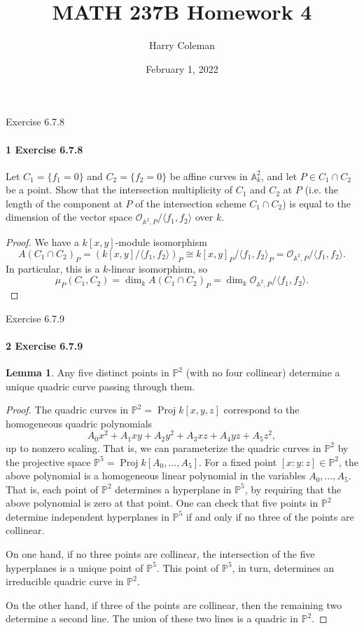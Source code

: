 \documentclass[12pt]{article}
\renewcommand{\maketitle}{\thispagestyle{title}}
\newlength{\myparskip}
\newenvironment{fullbox}{\begin{lrbox}{\savefullbox}\begin{minipage}{\dimexpr\textwidth-2\fboxsep\relax}\setlength{\parskip}{\myparskip}}{\end{minipage}\end{lrbox}\framebox[\textwidth]{\usebox{\savefullbox}}}
\newenvironment{pbox}[1][]{\begin{fullbox}\ifx#1\empty\else\paragraph{#1}\phantom{}\fi}{\end{fullbox}}
\theoremstyle{definition}
\newtheorem{lemma}{Lemma}
\newcommand{\A}{\mathbb{A}}
\renewcommand{\P}{\mathbb{P}}
\newcommand{\<}{\langle}
\renewcommand{\>}{\rangle}
\newcommand{\isom}{\cong}
\newcommand{\OO}{\mathcal{O}}
\DeclareMathOperator{\Proj}{Proj}
\begin{document}
\title{MATH 237B Homework 4}
\author{Harry Coleman}
\date{February 1, 2022}
\maketitle


\begin{pbox}[1 Exercise 6.7.8]
    Let $C_1 = \{f_1 = 0\}$ and $C_2 = \{f_2 = 0\}$ be affine curves in $\A_k^2$, and let $P \in C_1 \cap C_2$ be a point.
    Show that the intersection multiplicity of $C_1$ and $C_2$ at $P$ (i.e. the length of the component at $P$ of the intersection scheme $C_1 \cap C_2$) is equal to the dimension of the vector space $\OO_{\A^2, P}/\<f_1, f_2\>$ over $k$.
\end{pbox}

\begin{proof}
    We have a $k[x, y]$-module isomorphism
    \[
        A(C_1 \cap C_2)_P
            = (k[x, y]/\<f_1, f_2\>)_P
            \isom k[x, y]_P / \<f_1, f_2\>_P
            = \OO_{\A^2, P}/\<f_1, f_2\>.
    \]
    In particular, this is a $k$-linear isomorphism, so
    \[
        \mu_P(C_1, C_2)
            = \dim_k A(C_1 \cap C_2)_P
            = \dim_k \OO_{\A^2, P}/\<f_1, f_2\>.
    \]
\end{proof}

\newpage
\begin{pbox}[2 Exercise 6.7.9]
    
\end{pbox}

\begin{lemma}
    Any five distinct points in $\P^2$ (with no four collinear) determine a unique quadric curve passing through them.
\end{lemma}

\begin{proof}
    The quadric curves in $\P^2 = \Proj k[x, y, z]$ correspond to the homogeneous quadric polynomials
    \[
        A_0x^2 + A_1xy + A_2y^2 + A_3xz + A_4yz + A_5z^2,
    \]
    up to nonzero scaling.
    That is, we can parameterize the quadric curves in $\P^2$ by the projective space $\P^5 = \Proj k[A_0, \dots, A_5]$.
    For a fixed point $[x : y : z] \in \P^2$, the above polynomial is a homogeneous linear polynomial in the variables $A_0, \dots, A_5$.
    That is, each point of $\P^2$ determines a hyperplane in $\P^5$, by requiring that the above polynomial is zero at that point.
    One can check that five points in $\P^2$ determine independent hyperplanes in $\P^5$ if and only if no three of the points are collinear.

    On one hand, if no three points are collinear, the intersection of the five hyperplanes is a unique point of $\P^5$.
    This point of $\P^5$, in turn, determines an irreducible quadric curve in $\P^2$.

    On the other hand, if three of the points are collinear, then the remaining two determine a second line.
    The union of these two lines is a quadric in $\P^2$.
\end{proof}
\end{document}
